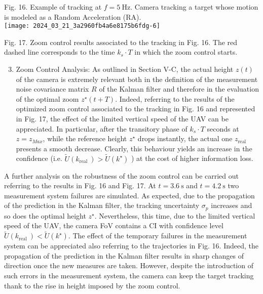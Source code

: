 \documentclass[conference]{IEEEtran}
\begin{document}
Fig. 16. Example of tracking at $f=5 \mathrm{~Hz}$. Camera tracking a target whose motion is modeled as a Random Acceleration (RA).\\
\texttt{[image: 2024\_03\_21\_3a2960fb4a6e8175b6fdg-6]}

Fig. 17. Zoom control results associated to the tracking in Fig. 16. The red dashed line corresponds to the time $k_{s} \cdot T$ in which the zoom control starts.

\begin{enumerate}
  \setcounter{enumi}{2}
  \item Zoom Control Analysis: As outlined in Section V-C, the actual height $z(t)$ of the camera is extremely relevant both in the definition of the measurement noise covariance matrix $R$ of the Kalman filter and therefore in the evaluation of the optimal zoom $z^{\star}(t+T)$. Indeed, referring to the results of the optimized zoom control associated to the tracking in Fig. 16 and represented in Fig. 17, the effect of the limited vertical speed of the UAV can be appreciated. In particular, after the transitory phase of $k_{s} \cdot T$ seconds at $z=z_{M a x}$, while the reference height $z^{\star}$ drops instantly, the actual one $z_{\text {real }}$ presents a smooth decrease. Clearly, this behaviour yields an increase in the confidence (i.e. $\tilde{U}\left(k_{\text {real }}\right)>\tilde{U}\left(k^{\star}\right)$ ) at the cost of higher information loss.
\end{enumerate}

A further analysis on the robustness of the zoom control can be carried out referring to the results in Fig. 16 and Fig. 17. At $t=3.6 \mathrm{~s}$ and $t=4.2 \mathrm{~s}$ two measurement system failures are simulated. As expected, due to the propagation of the prediction in the Kalman filter, the tracking uncertainty $\sigma_{p}$ increases and so does the optimal height $z^{\star}$. Nevertheless, this time, due to the limited vertical speed of the UAV, the camera FoV contains a CI with confidence level $\tilde{U}\left(k_{\text {real }}\right)<\tilde{U}\left(k^{\star}\right)$. The effect of the temporary failures in the measurement system can be appreciated also referring to the trajectories in Fig. 16. Indeed, the propagation of the prediction in the Kalman filter results in sharp changes of direction once the new measures are taken. However, despite the introduction of such errors in the measurement system, the camera can keep the target tracking thank to the rise in height imposed by the zoom control.
\end{document}
